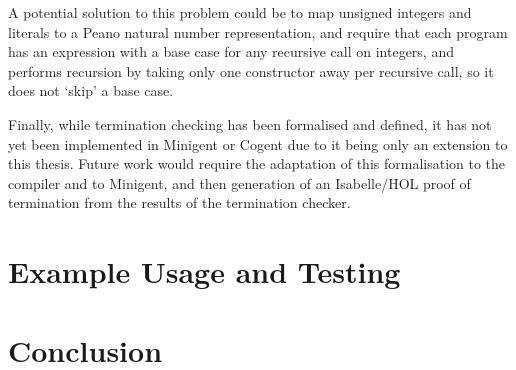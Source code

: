 A potential solution to this problem could be to map unsigned integers
and literals to a Peano natural number representation, and require that
each program has an expression with a base case for any recursive call
on integers, and performs recursion by taking only one constructor
away per recursive call, so it does not `skip' a base case.

Finally, while termination checking has been formalised and defined,
it has not yet been implemented in Minigent or Cogent due to it being
only an extension to this thesis. Future work would require the adaptation
of this formalisation to the compiler and to Minigent, and then
generation of an Isabelle/HOL proof of termination from the results
of the termination checker.

\section{Example Usage and Testing}
\label{ch:examplesandtesting}


\section{Conclusion}

